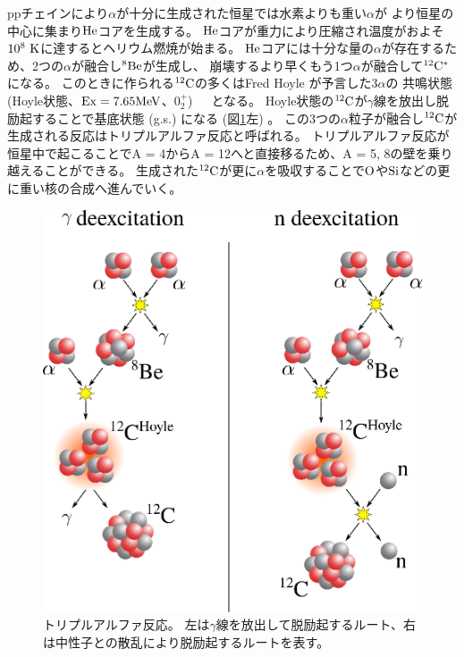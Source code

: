 ppチェインにより$\alpha$が十分に生成された恒星では水素よりも重い$\alpha$が
より恒星の中心に集まり${\rm He}$コアを生成する。
${\rm He}$コアが重力により圧縮され温度がおよそ$10^8~{\rm K}$に達するとヘリウム燃焼が始まる。
${\rm He}$コアには十分な量の$\alpha$が存在するため、2つの$\alpha$が融合し${}^{8}{\rm Be}$が生成し、
崩壊するより早くもう1つ$\alpha$が融合して${}^{12}{\rm C}^{*}$になる。
このときに作られる${}^{12}{\rm C}$の多くはFred Hoyle が予言した$3\alpha$の
共鳴状態 (Hoyle状態、${\rm Ex} = 7.65{\rm MeV}$、$0_{2}^{+}$)~\cite{hoyle_state}　となる。
Hoyle状態の${}^{12}{\rm C}$が$\gamma$線を放出し脱励起することで基底状態 (g.s.) になる (図\ref{fig::triple_alpha}左) 。
この3つの$\alpha$粒子が融合し${}^{12}{\rm C}$が生成される反応はトリプルアルファ反応と呼ばれる。
トリプルアルファ反応が恒星中で起こることでA = 4からA = 12へと直接移るため、A = 5, 8の壁を乗り越えることができる。
生成された${}^{12}{\rm C}$が更に$\alpha$を吸収することで${\rm O}$や${\rm Si}$などの更に重い核の合成へ進んでいく。

\begin{figure}
  \centering
  \includegraphics[clip, width=0.7\columnwidth]{eps/triple_alpha.eps}
  \caption[トリプルアルファ反応。]{トリプルアルファ反応。
    左は$\gamma$線を放出して脱励起するルート、右は中性子との散乱により脱励起するルートを表す。}
  \label{fig::triple_alpha}
\end{figure}

